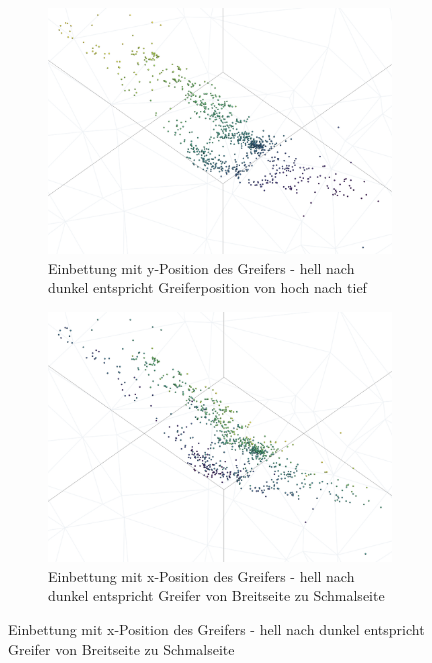 	\begin{figure}[h]
		\centering
		\begin{subfigure}[c]{0.49\textwidth}			
			\includegraphics[width=1\textwidth,center]{bilder/Hauptteil/MT_Grapple/emb_y.png}
			\caption{Einbettung mit y-Position des Greifers - hell nach dunkel entspricht Greiferposition von hoch nach tief}
			\label{img:Emb_y_MT}	
		\end{subfigure}
		\begin{subfigure}[c]{0.49\textwidth}			
			\includegraphics[width=1\textwidth, center]{bilder/Hauptteil/MT_Grapple/emb_x.png}
			\caption{Einbettung mit x-Position des Greifers - hell nach dunkel entspricht Greifer von Breitseite zu Schmalseite}
			\label{img:Emb_x_MT}	
		\end{subfigure}

\end{figure}
